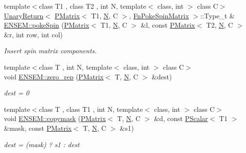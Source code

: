 \begin{DoxyCompactItemize}
\item 
{\footnotesize template$<$class T1 , class T2 , int N, template$<$ class, int $>$ class C$>$ }\\\mbox{\hyperlink{structENSEM_1_1UnaryReturn}{Unary\+Return}}$<$ \mbox{\hyperlink{classENSEM_1_1PMatrix}{P\+Matrix}}$<$ T1, \mbox{\hyperlink{operator__name__util_8cc_a7722c8ecbb62d99aee7ce68b1752f337}{N}}, C $>$, \mbox{\hyperlink{structENSEM_1_1FnPokeSpinMatrix}{Fn\+Poke\+Spin\+Matrix}} $>$\+::Type\+\_\+t \& \mbox{\hyperlink{group__primmatrix_gaf6f04aa80d2490f962a3132eb16fa98a}{E\+N\+S\+E\+M\+::poke\+Spin}} (\mbox{\hyperlink{classENSEM_1_1PMatrix}{P\+Matrix}}$<$ T1, \mbox{\hyperlink{operator__name__util_8cc_a7722c8ecbb62d99aee7ce68b1752f337}{N}}, C $>$ \&l, const \mbox{\hyperlink{classENSEM_1_1PMatrix}{P\+Matrix}}$<$ T2, \mbox{\hyperlink{operator__name__util_8cc_a7722c8ecbb62d99aee7ce68b1752f337}{N}}, C $>$ \&r, int row, int col)
\begin{DoxyCompactList}\small\item\em Insert spin matrix components. \end{DoxyCompactList}\item 
{\footnotesize template$<$class T , int N, template$<$ class, int $>$ class C$>$ }\\void \mbox{\hyperlink{group__primmatrix_gab1edf71028dd684730e061dcc75b5b83}{E\+N\+S\+E\+M\+::zero\+\_\+rep}} (\mbox{\hyperlink{classENSEM_1_1PMatrix}{P\+Matrix}}$<$ T, \mbox{\hyperlink{operator__name__util_8cc_a7722c8ecbb62d99aee7ce68b1752f337}{N}}, C $>$ \&dest)
\begin{DoxyCompactList}\small\item\em dest = 0 \end{DoxyCompactList}\item 
{\footnotesize template$<$class T , class T1 , int N, template$<$ class, int $>$ class C$>$ }\\void \mbox{\hyperlink{group__primmatrix_ga6bebd0377eb8253b3d4ba1586d1ecdad}{E\+N\+S\+E\+M\+::copymask}} (\mbox{\hyperlink{classENSEM_1_1PMatrix}{P\+Matrix}}$<$ T, \mbox{\hyperlink{operator__name__util_8cc_a7722c8ecbb62d99aee7ce68b1752f337}{N}}, C $>$ \&d, const \mbox{\hyperlink{classENSEM_1_1PScalar}{P\+Scalar}}$<$ T1 $>$ \&mask, const \mbox{\hyperlink{classENSEM_1_1PMatrix}{P\+Matrix}}$<$ T, \mbox{\hyperlink{operator__name__util_8cc_a7722c8ecbb62d99aee7ce68b1752f337}{N}}, C $>$ \&s1)
\begin{DoxyCompactList}\small\item\em dest = (mask) ? s1 \+: dest \end{DoxyCompactList}\item 

\end{DoxyCompactItemize}
